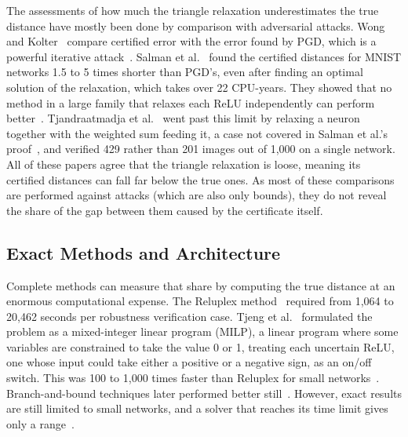 The assessments of how much the triangle relaxation underestimates the true distance
have mostly been done by comparison with adversarial attacks.
Wong and Kolter~\cite[Tab.~1, p.~8]{MapSource09} compare certified error with the error found by
PGD, which is a powerful iterative attack~\cite{MapSource04}. Salman et al.~\cite[Sec.~6.2,
p.~9]{MapSource10} found the certified distances for MNIST networks 1.5 to 5 times shorter than
PGD's, even after finding an optimal solution of the relaxation, which takes over 22 CPU-years. They
showed that no method in a large family that relaxes each ReLU independently can perform
better~\cite[Cor.~4.3, p.~6]{MapSource10}. Tjandraatmadja et al.~\cite[Tab.~1, p.~9]{MapSource15}
went past this limit by relaxing a neuron together with the weighted sum feeding it, a case not
covered in Salman et al.'s proof~\cite[p.~4]{MapSource10}, and verified 429 rather than 201 images
out of 1,000 on a single network. All of these papers agree that the triangle relaxation is
loose, meaning its certified distances can fall far below the true ones.
As most of these comparisons are performed against attacks (which are also only bounds), they do not
reveal the share of the gap between them caused by the certificate itself.

\subsection{Exact Methods and Architecture}
\label{sec:lr-exact}

Complete methods can measure that share by computing the true distance at an enormous computational
expense. The Reluplex method~\cite[Tab.~3, p.~17]{MapSource11} required from 1,064 to 20,462 seconds
per robustness verification case. Tjeng et al.~\cite{MapSource12} formulated the problem as a
mixed-integer linear program (MILP), a linear program where some variables are constrained to take
the value 0 or 1, treating each uncertain ReLU, one whose input could take either a positive or a
negative sign, as an on/off switch. This was 100 to 1,000 times faster than Reluplex for small
networks~\cite[Fig.~1, p.~6]{MapSource12}. Branch-and-bound techniques later performed better
still~\cite{MapSource13}. However, exact results are still limited to small networks, and a solver
that reaches its time limit gives only a range~\cite[Sec.~4, p.~13]{MapSource11}.


